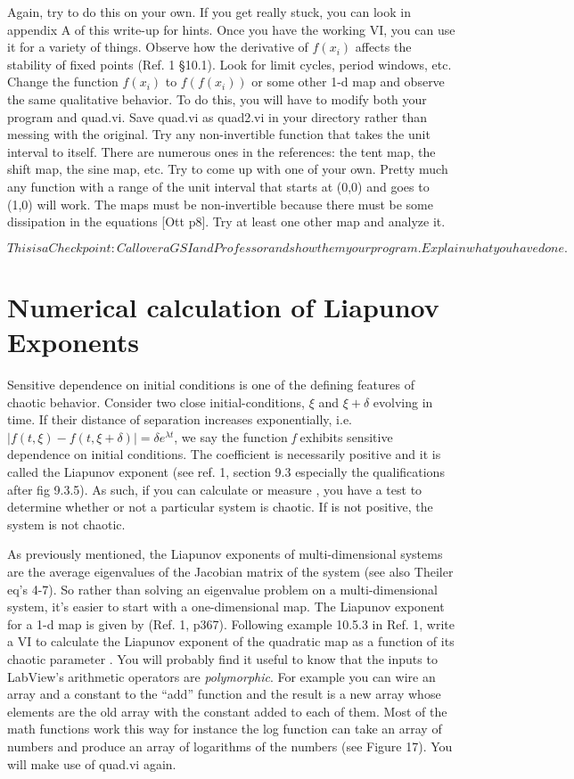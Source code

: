 \documentclass{../lab}
\begin{document}
Again, try to do this on your own. If you get really stuck, you can look in appendix A of this write-up for hints. Once you have the working VI, you can use it for a variety of things. Observe how the derivative of $ f(x_i) $ affects the stability of fixed points (Ref. 1 §10.1). Look for limit cycles, period windows, etc. Change the function $ f(x_i) $ to $ f(f(x_i)) $ or some other 1-d map and observe the same qualitative behavior. To do this, you will have to modify both your program and quad.vi. Save quad.vi as quad2.vi in your directory rather than messing with the original. Try any non-invertible function that takes the unit interval to itself. There are numerous ones in the references: the tent map, the shift map, the sine map, etc. Try to come up with one of your own. Pretty much any function with a range of the unit interval that starts at (0,0) and goes to (1,0) will work. The maps must be non-invertible because there must be some dissipation in the equations [Ott p8]. Try at least one other map and analyze it.

\begin{equation}
     This is a Checkpoint: Call over a GSI and Professor and show them your program. Explain what you have done.
\end{equation}
\section{Numerical calculation of Liapunov Exponents}

Sensitive dependence on initial conditions is one of the defining features of chaotic behavior. Consider two close initial-conditions, $ \xi $ and $ \xi +\delta $ evolving in time. If their distance of separation increases exponentially, i.e. $ |f(t,\xi)-f(t,\xi +\delta)|=\delta e^{\lambda t} $, we say the function \emph{f} exhibits sensitive dependence on initial conditions. The coefficient is necessarily positive and it is called the Liapunov exponent (see ref. 1, section 9.3 especially the qualifications after fig 9.3.5). As such, if you can calculate or measure , you have a test to determine whether or not a particular system is chaotic. If is not positive, the system is not chaotic.

As previously mentioned, the Liapunov exponents of multi-dimensional systems are the average eigenvalues of the Jacobian matrix of the system (see also Theiler eq's 4-7). So rather than solving an eigenvalue problem on a multi-dimensional system, it's easier to start with a one-dimensional map. The Liapunov exponent for a 1-d map is given by (Ref. 1, p367). Following example 10.5.3 in Ref. 1, write a VI to calculate the Liapunov exponent of the quadratic map as a function of its chaotic parameter . You will probably find it useful to know that the inputs to LabView's arithmetic operators are \emph{polymorphic}. For example you can wire an array and a constant to the ``add'' function and the result is a new array whose elements are the old array with the constant added to each of them. Most of the math functions work this way for instance the log function can take an array of numbers and produce an array of logarithms of the numbers (see Figure 17). You will make use of quad.vi again.
\end{document}
